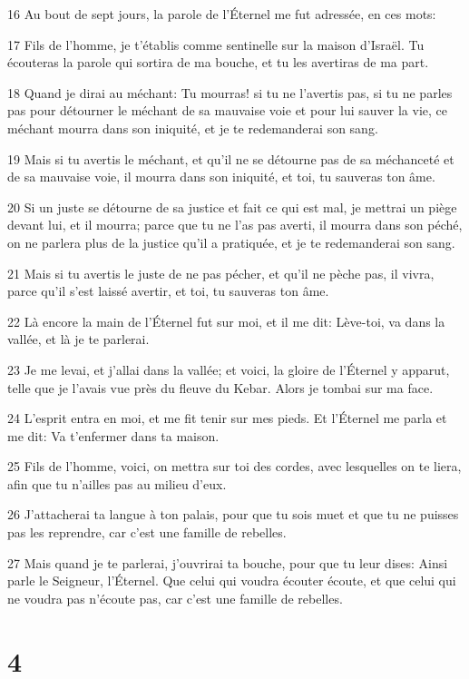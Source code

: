 \par 16 Au bout de sept jours, la parole de l'Éternel me fut adressée, en ces mots:
\par 17 Fils de l'homme, je t'établis comme sentinelle sur la maison d'Israël. Tu écouteras la parole qui sortira de ma bouche, et tu les avertiras de ma part.
\par 18 Quand je dirai au méchant: Tu mourras! si tu ne l'avertis pas, si tu ne parles pas pour détourner le méchant de sa mauvaise voie et pour lui sauver la vie, ce méchant mourra dans son iniquité, et je te redemanderai son sang.
\par 19 Mais si tu avertis le méchant, et qu'il ne se détourne pas de sa méchanceté et de sa mauvaise voie, il mourra dans son iniquité, et toi, tu sauveras ton âme.
\par 20 Si un juste se détourne de sa justice et fait ce qui est mal, je mettrai un piège devant lui, et il mourra; parce que tu ne l'as pas averti, il mourra dans son péché, on ne parlera plus de la justice qu'il a pratiquée, et je te redemanderai son sang.
\par 21 Mais si tu avertis le juste de ne pas pécher, et qu'il ne pèche pas, il vivra, parce qu'il s'est laissé avertir, et toi, tu sauveras ton âme.
\par 22 Là encore la main de l'Éternel fut sur moi, et il me dit: Lève-toi, va dans la vallée, et là je te parlerai.
\par 23 Je me levai, et j'allai dans la vallée; et voici, la gloire de l'Éternel y apparut, telle que je l'avais vue près du fleuve du Kebar. Alors je tombai sur ma face.
\par 24 L'esprit entra en moi, et me fit tenir sur mes pieds. Et l'Éternel me parla et me dit: Va t'enfermer dans ta maison.
\par 25 Fils de l'homme, voici, on mettra sur toi des cordes, avec lesquelles on te liera, afin que tu n'ailles pas au milieu d'eux.
\par 26 J'attacherai ta langue à ton palais, pour que tu sois muet et que tu ne puisses pas les reprendre, car c'est une famille de rebelles.
\par 27 Mais quand je te parlerai, j'ouvrirai ta bouche, pour que tu leur dises: Ainsi parle le Seigneur, l'Éternel. Que celui qui voudra écouter écoute, et que celui qui ne voudra pas n'écoute pas, car c'est une famille de rebelles.

\chapter{4}

